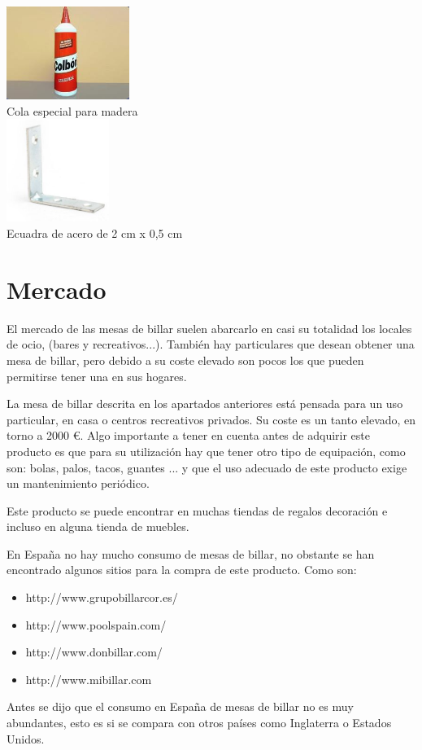 \begin{center}
    		\includegraphics[width=0.3\textwidth]{cola.jpg}
		   \\ \small {Cola especial para madera} \\[0.5cm]
		\includegraphics[width=0.25\textwidth]{escuadra.jpg}
		      \\ \small {Ecuadra de acero de 2 cm  x 0,5 cm } 
	\end{center}

\clearpage
\section {Mercado}

El mercado de las mesas de billar suelen abarcarlo en casi su totalidad los locales de ocio, (bares y recreativos...). También hay particulares que desean obtener una
mesa de billar, pero debido a su coste elevado son pocos los que pueden permitirse tener una en sus hogares. 

La mesa de billar descrita en los apartados anteriores está pensada para un uso particular, en casa o centros recreativos privados. Su coste es un tanto elevado, en torno a 2000 \euro.
Algo importante a tener en cuenta antes de adquirir este producto es que para su utilización hay que tener otro tipo de equipación, como son:  bolas, palos, tacos, guantes ... y que el uso adecuado de este producto exige un mantenimiento periódico.  

Este producto se puede encontrar en muchas tiendas de regalos decoración e incluso en alguna tienda de muebles.

En España no hay  mucho consumo de mesas de billar, no obstante se han encontrado algunos sitios para la compra de este producto.
Como son:

\begin{itemize}
  \item http://www.grupobillarcor.es/
 \item http://www.poolspain.com/
 \item http://www.donbillar.com/
 \item http://www.mibillar.com
\end{itemize}
   
Antes se dijo que el consumo en España de mesas de billar no es muy abundantes, esto es si se compara con otros países como Inglaterra o Estados Unidos.

